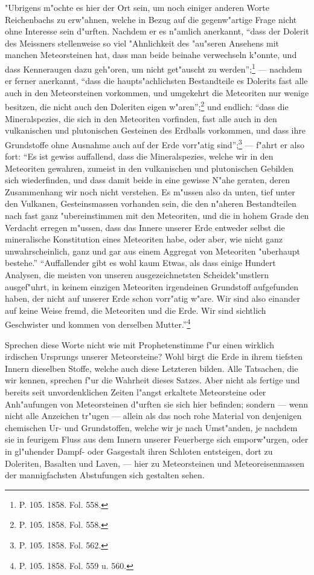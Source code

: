 \documentclass[a4paper, 8pt, oneside, polutonikogreek, german]{article}
\begin{document}
"Ubrigens m"ochte es hier der Ort sein, um noch einiger anderen Worte Reichenbachs zu erw"ahnen, welche in Bezug auf die gegenw"artige Frage nicht ohne Interesse sein d"urften. Nachdem er es n"amlich anerkannt, "`dass der Dolerit des Meissners stellenweise so viel "Ahnlichkeit des "au"seren Ansehens mit manchen Meteorsteinen hat, dass man beide beinahe verwechseln k"onnte, und dass Kenneraugen dazu geh"oren, um nicht get"auscht zu werden"';\footnote{P. 105. 1858. Fol. 558.} --- nachdem er ferner anerkannt, "`dass die haupts"achlichsten Bestandteile es Dolerits fast alle auch in den Meteorsteinen vorkommen, und umgekehrt die Meteoriten nur wenige besitzen, die nicht auch den Doleriten eigen w"aren"';\footnote{P. 105. 1858. Fol. 558.} und endlich: "`dass die Mineralspezies, die sich in den Meteoriten vorfinden, fast alle auch in den vulkanischen und plutonischen Gesteinen des Erdballs vorkommen, und dass ihre Grundstoffe ohne Ausnahme auch auf der Erde vorr"atig sind"';\footnote{P. 105. 1858. Fol. 562.} --- f"ahrt er also fort: "`Es ist gewiss auffallend, dass die Mineralspezies, welche wir in den Meteoriten gewahren, zumeist in den vulkanischen und plutonischen Gebilden sich wiederfinden, und dass damit beide in eine gewisse N"ahe geraten, deren Zusammenhang wir noch nicht verstehen. Es m"ussen also da unten, tief unter den Vulkanen, Gesteinsmassen vorhanden sein, die den n"aheren Bestandteilen nach fast ganz "ubereinstimmen mit den Meteoriten, und die in hohem Grade den Verdacht erregen m"ussen, dass das Innere unserer Erde entweder selbst die mineralische Konstitution eines Meteoriten habe, oder aber, wie nicht ganz unwahrscheinlich, ganz und gar aus einem Aggregat von Meteoriten "uberhaupt bestehe."' "`Auffallender gibt es wohl kaum Etwas, als dass einige Hundert Analysen, die meisten von unseren ausgezeichnetsten Scheidek"unstlern ausgef"uhrt, in keinem einzigen Meteoriten irgendeinen Grundstoff aufgefunden haben, der nicht auf unserer Erde schon vorr"atig w"are. Wir sind also einander auf keine Weise fremd, die Meteoriten und die Erde. Wir sind sichtlich Geschwister und kommen von derselben Mutter."'\footnote{P. 105. 1858. Fol. 559 u. 560.}

Sprechen diese Worte nicht wie mit Prophetenstimme f"ur einen wirklich irdischen Ursprungs unserer Meteorsteine? Wohl birgt die Erde in ihrem tiefsten Innern dieselben Stoffe, welche auch diese Letzteren bilden. Alle Tatsachen, die wir kennen, sprechen f"ur die Wahrheit dieses Satzes. Aber nicht als fertige und bereits seit unvordenklichen Zeiten l"angst erkaltete Meteorsteine oder Anh"aufungen von Meteorsteinen d"urften sie sich hier befinden; sondern --- wenn nicht alle Anzeichen tr"ugen --- allein als das noch rohe Material von denjenigen chemischen Ur- und Grundstoffen, welche wir je nach Umst"anden, je nachdem sie in feurigem Fluss aus dem Innern unserer Feuerberge sich emporw"urgen, oder in gl"uhender Dampf- oder Gasgestalt ihren Schloten entsteigen, dort zu Doleriten, Basalten und Laven, --- hier zu Meteorsteinen und Meteoreisenmassen der mannigfachsten Abstufungen sich gestalten sehen.
\end{document}
